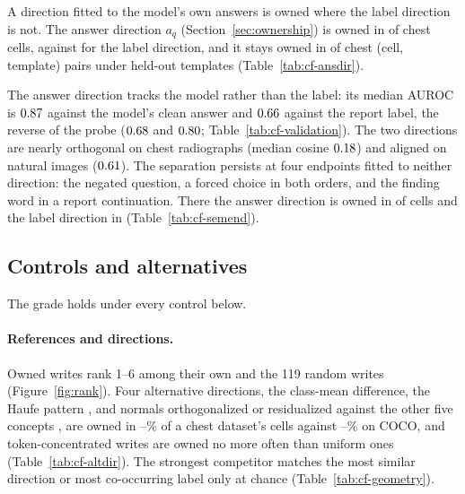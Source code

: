 \documentclass[11pt]{article}
\begin{document}
A direction fitted to the model's own answers is owned where the label direction is not. The answer direction $a_q$ (Section~\ref{sec:ownership}) is owned in \cfAnsChestOwnedA{} of \cfAnsChestN{} chest cells, against \cfAnsChestOwnedLabel{} for the label direction, and it stays owned in \cfAnsdirtChestKept{} of \cfAnsdirtChestKeptN{} chest (cell, template) pairs under held-out templates (Table~\ref{tab:cf-ansdir}).

The answer direction tracks the model rather than the label: its median AUROC is $0.87$ against the model's clean answer and $0.66$ against the report label, the reverse of the probe ($0.68$ and $0.80$; Table~\ref{tab:cf-validation}). The two directions are nearly orthogonal on chest radiographs (median cosine $0.18$) and aligned on natural images ($0.61$). The separation persists at four endpoints fitted to neither direction: the negated question, a forced choice in both orders, and the finding word in a report continuation. There the answer direction is owned in \cfSemAnswerOwned{} of \cfSemCells{} cells and the label direction in \cfSemLabelOwned{} (Table~\ref{tab:cf-semend}).

\subsection{Controls and alternatives}
\label{sec:controls}
\label{sec:robust-geometry}

The grade holds under every control below.

\paragraph{References and directions.} Owned writes rank 1--6 among their own and the 119 random writes (Figure~\ref{fig:rank}). Four alternative directions, the class-mean difference, the Haufe pattern \citep{haufe2014interpretation}, and normals orthogonalized or residualized against the other five concepts \citep{nicolson2025explaining}, are owned in \cfAltdirChestPctMin{}--\cfAltdirChestPctMax\% of a chest dataset's cells against \cfAltdirCocoPctMin{}--\cfAltdirCocoPctMax\% on COCO, and token-concentrated writes are owned no more often than uniform ones (Table~\ref{tab:cf-altdir}). The strongest competitor matches the most similar direction or most co-occurring label only at chance (Table~\ref{tab:cf-geometry}).
\end{document}
